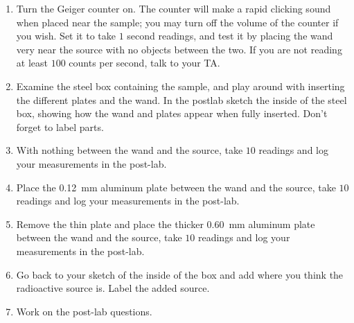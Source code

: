 \documentclass[addpoints]{physlabs}  %
\begin{document}
\begin{labsection}
\begin{experiment}
\begin{enumerate}
\item Turn the Geiger counter on. The counter will make a rapid clicking sound when placed near the sample; you may turn off the volume of the counter if you wish.
Set it to take $1$ second readings, and test it by placing the wand very near the source with no objects between the two.
If you are not reading at least $100$ counts per second, talk to your TA.
\item Examine the steel box containing the sample, and play around with inserting the different plates and the wand.
In the postlab sketch the inside of the steel box, showing how the wand and plates appear when fully inserted.
Don't forget to label parts.
\item With nothing between the wand and the source, take $10$ readings and log your measurements in the post-lab.
\item Place the \qty{0.12}{\milli\meter} aluminum plate between the wand and the source, take $10$ readings and log your measurements in the post-lab.
\item Remove the thin plate and place the thicker \qty{0.60}{\milli\meter} aluminum plate between the wand and the source, take $10$ readings and log your measurements in the post-lab.
\item Go back to your sketch of the inside of the box and add where you think the radioactive source is. Label the added source.
\item Work on the post-lab questions.


\end{enumerate}
\end{experiment}

\end{labsection}
\end{document}
